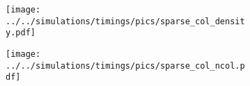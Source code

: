\documentclass{article}
\begin{document}
\begin{figure}[bt]
    \centering
    \begin{subfigure}[b]{0.49\textwidth}
        \texttt{[image: ../../simulations/timings/pics/sparse\_col\_density.pdf]}
        \caption{}
    \end{subfigure}
    \begin{subfigure}[b]{0.49\textwidth}
        \texttt{[image: ../../simulations/timings/pics/sparse\_col\_ncol.pdf]}
        \caption{}
    \end{subfigure}
\end{figure}
\end{document}

